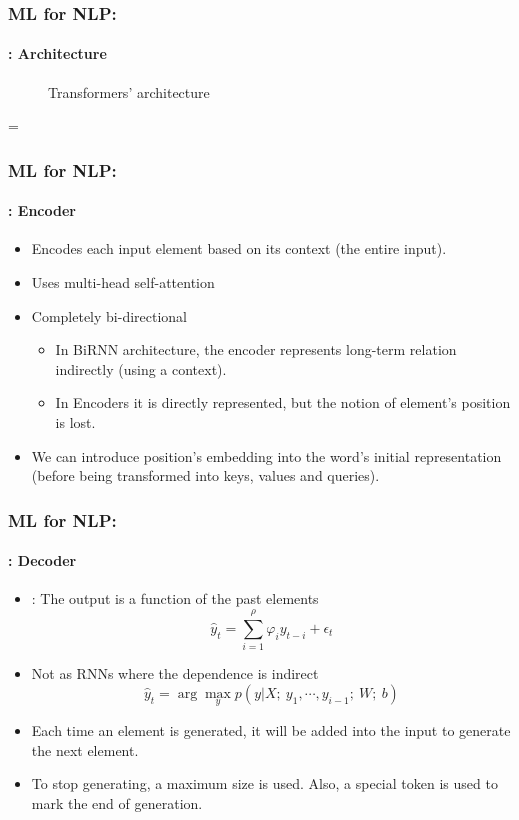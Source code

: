 \documentclass[xcolor=table]{beamer}
\begin{document}
	\begin{frame}
		\frametitle{ML for NLP: \insertsection}
		\framesubtitle{\insertsubsection: Architecture}
		
		\begin{minipage}{0.49\textwidth}
			\begin{figure}
				\centering
				\vskip-8pt
				\caption{Transformers' architecture \cite{2017-vaswani-al}}
			\end{figure}
		\end{minipage}
		\begin{minipage}{0.1\textwidth}
			=
		\end{minipage}
		\begin{minipage}{0.39\textwidth}
		\end{minipage}
	\end{frame}

	\begin{frame}
		\frametitle{ML for NLP: \insertsection}
		\framesubtitle{\insertsubsection: Encoder}
		\begin{itemize}
			\item Encodes each input element based on its context (the entire input).
			\item Uses multi-head self-attention
			\item Completely bi-directional
			\begin{itemize}
				\item In BiRNN architecture, the encoder represents long-term relation indirectly (using a context).
				\item In Encoders it is directly represented, but the notion of element's position is lost.
			\end{itemize} 
			\item We can introduce position's embedding into the word's initial representation (before being transformed into keys, values and queries).
		\end{itemize}
	\end{frame}

	\begin{frame}
		\frametitle{ML for NLP: \insertsection}
		\framesubtitle{\insertsubsection: Decoder}
		\begin{itemize}
			\item {}: The output is a  function of the past elements
			\[\hat{y}_t = \sum_{i = 1}^{\rho} \varphi_{i} y_{t-i} + \epsilon_t\]
			\item Not as RNNs where the dependence is indirect
			\[\hat{y}_t = \arg\max_y p(y | X;\ y_1, \cdots, y_{i-1};\ W;\ b)\]
			\item Each time an element is generated, it will be added into the input to generate the next element.
			\item To stop generating, a maximum size is used. Also, a special token is used to mark the end of generation.
		\end{itemize}
	\end{frame}
\end{document}
